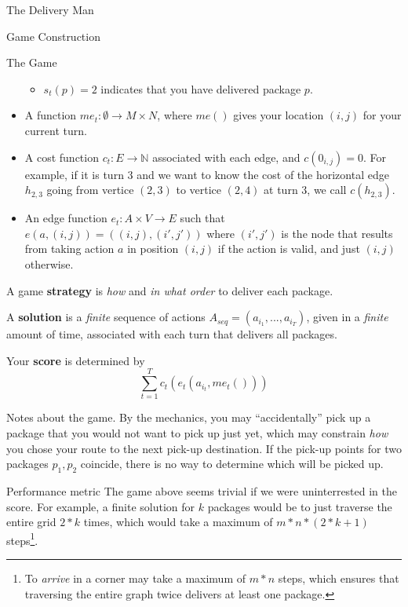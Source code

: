 \begin{section}{The Delivery Man}
\begin{subsection}{Game Construction}
\begin{subsubsection}{The Game}
\begin{itemize}
\begin{itemize}
        \item $s_t(p) = 2$ indicates that you have delivered package $p$.
        \end{itemize}

      \item A function $me_t: \emptyset \rightarrow M\times N$, where $me ()$ gives your location $(i, j)$ for your current turn.

      \item A cost function $c_t: E \rightarrow \mathbb{N}$ associated with each edge, and $c(0_{i,j}) = 0$. For example, if it is turn $3$ and we want to know the cost of the horizontal edge $h_{2,3}$ going from vertice $(2, 3)$ to vertice $(2, 4)$ at turn $3$, we call $c(h_{2,3})$.

      \item An edge function $e_t: A\times V \rightarrow E$ such that $e(a, (i,j)) = ((i, j),(i',j'))$ where $(i', j')$ is the node that results from taking action $a$ in position $(i,j)$ if the action is valid, and just $(i, j)$ otherwise.
      \end{itemize}
      
      A game \textbf{strategy} is \textit{how} and \textit{in what order} to deliver each package.

      A \textbf{solution} is a \textit{finite} sequence of actions $A_{seq} = (a_{i_1}, ..., a_{i_T})$, given in a \textit{finite} amount of time, associated with each turn that delivers all packages.

      Your \textbf{score} is determined by
      \begin{equation*}
        \sum_{t = 1}^T c_t(e_t(a_{i_t}, me_t()))
      \end{equation*}      

      \begin{paragraph}{Notes about the game.}
        By the mechanics, you may ``accidentally'' pick up a package that you would not want to pick up just yet, which may constrain \textit{how} you chose your route to the next pick-up destination. If the pick-up points for two packages $p_1, p_2$ coincide, there is no way to determine which will be picked up.
      \end{paragraph}

    \end{subsubsection}
    
    \begin{subsubsection}{Performance metric}
      The game above seems trivial if we were uninterrested in the score. For example, a finite solution for $k$ packages would be to just traverse the entire grid $2*k$ times, which would take a maximum of $m*n*(2*k+1)$ steps\footnote{To \textit{arrive} in a corner may take a maximum of $m*n$ steps, which ensures that traversing the entire graph twice delivers at least one package.}.


\end{subsubsection}
\end{subsection}
\end{section}

